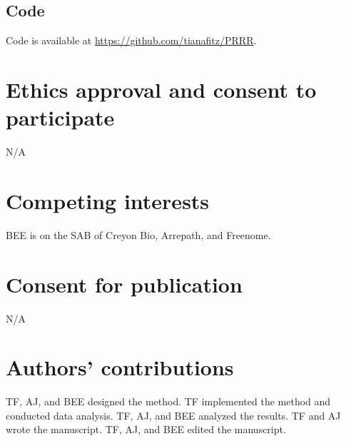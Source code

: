 \documentclass{bmcart}
\begin{document}
\begin{backmatter}
\subsection*{Code}
Code is available at \url{https://github.com/tianafitz/PRRR}.

\section*{Ethics approval and consent to participate}%
N/A

\section*{Competing interests}
BEE is on the SAB of Creyon Bio, Arrepath, and Freenome.

\section*{Consent for publication}%
N/A

\section*{Authors' contributions}
TF, AJ, and BEE designed the method. TF implemented the method and conducted data analysis. TF, AJ, and BEE analyzed the results. TF and AJ wrote the manuscript. TF, AJ, and BEE edited the manuscript.





\end{backmatter}
\end{document}
